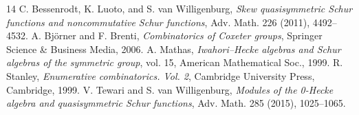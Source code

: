 \begin{thebibliography}{14}
 C. Bessenrodt, K. Luoto, and S. van Willigenburg, \emph{Skew quasisymmetric Schur functions and noncommutative Schur functions}, Adv. Math. 226 (2011), 4492--4532.
 A. Bj\"orner and F. Brenti, \emph{Combinatorics of Coxeter groups}, Springer Science \& Business Media, 2006.
 A. Mathas, \emph{Iwahori--Hecke algebras and Schur algebras of the symmetric group}, vol. 15, American Mathematical Soc., 1999.
 R. Stanley, \emph{Enumerative combinatorics. Vol. 2}, Cambridge University Press, Cambridge, 1999.
 V. Tewari and S. van Willigenburg, \emph{Modules of the 0-Hecke algebra and quasisymmetric Schur functions}, Adv. Math. 285 (2015), 1025--1065.
\end{thebibliography}
